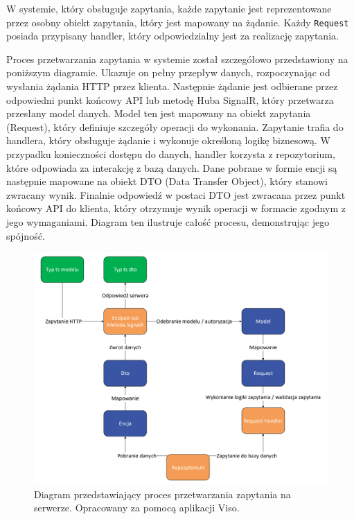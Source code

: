 \documentclass[twoside]{projektInzynierskiMS1}
\begin{document}
\noindent
W systemie, który obsługuje zapytania, każde zapytanie jest reprezentowane przez osobny obiekt zapytania, który jest mapowany na żądanie. Każdy \texttt{Request} posiada przypisany handler, który odpowiedzialny jest za realizację zapytania.

\newpage

\noindent
Proces przetwarzania zapytania w systemie został szczegółowo przedstawiony na poniższym diagramie. Ukazuje on pełny przepływ danych, rozpoczynając od wysłania żądania HTTP przez klienta. Następnie żądanie jest odbierane przez odpowiedni punkt końcowy API lub metodę Huba SignalR, który przetwarza przesłany model danych. Model ten jest mapowany na obiekt zapytania (Request), który definiuje szczegóły operacji do wykonania. Zapytanie trafia do handlera, który obsługuje żądanie i wykonuje określoną logikę biznesową. W przypadku konieczności dostępu do danych, handler korzysta z repozytorium, które odpowiada za interakcję z bazą danych. Dane pobrane w formie encji są następnie mapowane na obiekt DTO (Data Transfer Object), który stanowi zwracany wynik. Finalnie odpowiedź w postaci DTO jest zwracana przez punkt końcowy API do klienta, który otrzymuje wynik operacji w formacie zgodnym z jego wymaganiami. Diagram ten ilustruje całość procesu, demonstrując jego spójność.

\vspace{0.5cm}
\begin{figure}[h!]
    \centering
    \includegraphics[width=1\textwidth]{images/diagram_back.png}
    \caption{Diagram przedstawiający proces przetwarzania zapytania na serwerze. Opracowany za pomocą aplikacji Viso.}
\end{figure}
\end{document}
